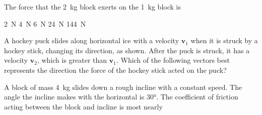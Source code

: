 \documentclass{../../../oss-ap12ibhl-print}
\begin{document}
\begin{questions}
  \question The force that the \SI{2}{\kilo\gram} block exerts on the
  \SI{1}{\kilo\gram} block is
  \begin{choices}
    \choice\SI{2}{\newton}
    \choice\SI{4}{\newton}
    \choice\SI{6}{\newton}
    \choice\SI{24}{\newton}
    \choice\SI{144}{\newton}
  \end{choices}
  \label{3blks2}
    
  \question A hockey puck slides along horizontal ice with a velocity $\bm{v}_1$
  when it is struck by a hockey stick, changing its direction, as shown. After
  the puck is struck, it has a velocity $\bm{v}_2$, which is greater than
  $\bm{v}_1$. Which of the following vectors best represents the direction the
  force of the hockey stick acted on the puck?
  \begin{center}
  \end{center}
  \begin{oneparchoices}
    \choice{\Huge $\uparrow$}
    \choice{\Huge $\leftarrow$}
    \choice{\Huge $\rightarrow$}
    \choice{\Huge $\nwarrow$}
    \choice{\Huge $\nearrow$}
  \end{oneparchoices}
  \vspace{.2in}
  
  \question A block of mass \SI{4}{\kilo\gram} slides down a rough incline with
  a constant speed. The angle the incline makes with the horizontal is
  \ang{30}. The coefficient of friction acting between the block and incline
  is most nearly

  \begin{minipage}{.3\linewidth}
  \end{minipage}
  \begin{minipage}{.4\linewidth}
    \begin{choices}
    \end{choices}
  \end{minipage}
    

\end{questions}
\end{document}
